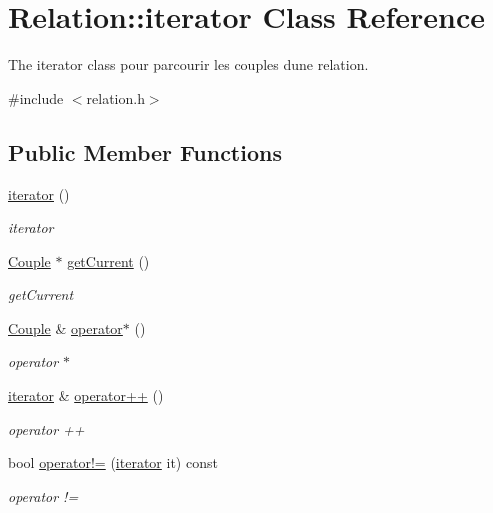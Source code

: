 \hypertarget{class_relation_1_1iterator}{}\section{Relation\+:\+:iterator Class Reference}
\label{class_relation_1_1iterator}


The iterator class pour parcourir les couples d\textquotesingle{}une relation.  




{\ttfamily \#include $<$relation.\+h$>$}

\subsection*{Public Member Functions}
\begin{DoxyCompactItemize}
\item 
\mbox{\label{class_relation_1_1iterator_a233dd5f849ee263780c2770fc83878c8}} 
\hyperlink{class_relation_1_1iterator_a233dd5f849ee263780c2770fc83878c8}{iterator} ()
\begin{DoxyCompactList}\small\item\em iterator \end{DoxyCompactList}\item 
\hyperlink{class_couple}{Couple} $\ast$ \hyperlink{class_relation_1_1iterator_a728be28e8dde170eb5b1118c1bbf40e8}{get\+Current} ()
\begin{DoxyCompactList}\small\item\em get\+Current \end{DoxyCompactList}\item 
\hyperlink{class_couple}{Couple} \& \hyperlink{class_relation_1_1iterator_a5aab57bf0e13b345aa8a2999342bf6a6}{operator$\ast$} ()
\begin{DoxyCompactList}\small\item\em operator $\ast$ \end{DoxyCompactList}\item 
\hyperlink{class_relation_1_1iterator}{iterator} \& \hyperlink{class_relation_1_1iterator_a52415588f41fd4b55d6bf97e2f86207d}{operator++} ()
\begin{DoxyCompactList}\small\item\em operator ++ \end{DoxyCompactList}\item 
bool \hyperlink{class_relation_1_1iterator_aafc9388a869b414adc2169e2e3beffc0}{operator!=} (\hyperlink{class_relation_1_1iterator}{iterator} it) const
\begin{DoxyCompactList}\small\item\em operator != \end{DoxyCompactList}\end{DoxyCompactItemize}
